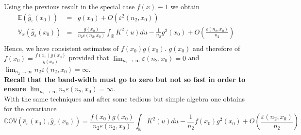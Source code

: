 \documentclass[a4paper,12pt,leqno, titlepage]{article}
\newcommand{\EX}{\mathbb{E}}
\newcommand{\VAR}{\mathbb{V}}
\newcommand{\COV}{\mathbb{COV}}
\newcommand{\R}{\mathbb{R}}
\begin{document}
\begin{appendix}
\begin{equation}
\end{equation}
Using the previous result in the special case $f(x)\equiv 1$ we obtain
\begin{eqnarray}\label{nadaraya4}
\EX(\hat{g}_{\varepsilon}(x_0))&=& g(x_0)+O(\varepsilon^2(n_2,x_0))\nonumber\\
\VAR_x(\hat{g}_{\varepsilon}(x_0))&=& \frac{g(x_0)}{n_2\varepsilon(n_2,x_0)}\int_{\R}K^2(u)du-\frac{1}{n_2}g^2(x_0)+O(\frac{\varepsilon(n_2,x_0)}{n_2})\nonumber\\
\end{eqnarray}
Hence, we have consistent estimates of $f(x_0)g(x_0)$. $g(x_0)$ and therefore of $f(x_0)=\frac{f(x_0)g(x_0)}{g(x_0)}$ provided that $\lim_{n_2\to\infty}\varepsilon(n_2,x_0)=0$ and $\lim_{n_2\to\infty}n_2\varepsilon(n_2,x_0)=\infty$. \\ \textbf{Recall that the band-width must go to zero but not so fast in order to ensure} $\lim_{n_2\to\infty}n_2\varepsilon(n_2,x_0)=\infty$.\\
With the same techniques and after some tedious but simple algebra one obtains for the covariance
\begin{equation}\label{nadaraya5}
\COV(\hat{e}_{\varepsilon}(x_0),\hat{g}_{\varepsilon}(x_0))=
\frac{f(x_0)g(x_0)}{n_2\varepsilon(n_2,x_0)}\int_{\R}K^2(u)du-\frac{1}{n_2}f(x_0)g^2(x_0)+O(\frac{\varepsilon(n_2,x_0)}{n_2})
\end{equation}


\end{appendix}
\end{document}
